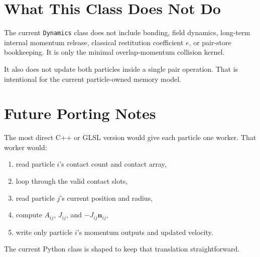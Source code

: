 \documentclass[11pt]{article}
\begin{document}
\section{What This Class Does Not Do}

The current \texttt{Dynamics} class does not include bonding, field dynamics,
long-term internal momentum release, classical restitution coefficient \(e\),
or pair-store bookkeeping. It is only the minimal overlap-momentum collision
kernel.

It also does not update both particles inside a single pair operation. That is
intentional for the current particle-owned memory model.

\section{Future Porting Notes}

The most direct C++ or GLSL version would give each particle one worker. That
worker would:

\begin{enumerate}
    \item read particle \(i\)'s contact count and contact array,
    \item loop through the valid contact slots,
    \item read particle \(j\)'s current position and radius,
    \item compute \(A_{ij}\), \(J_{ij}\), and \(-J_{ij}\mathbf{n}_{ij}\),
    \item write only particle \(i\)'s momentum outputs and updated velocity.
\end{enumerate}

The current Python class is shaped to keep that translation straightforward.
\end{document}

